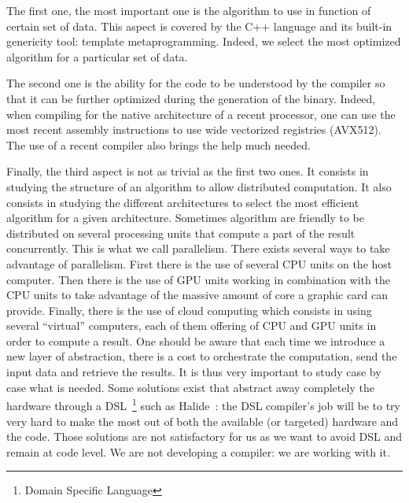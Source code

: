 The first one, the most important one is the algorithm to use in function of certain set of data. This aspect is covered
by the C++ language and its built-in genericity tool: template metaprogramming. Indeed, we select the most optimized
algorithm for a particular set of data.

The second one is the ability for the code to be understood by the compiler so that it can be further optimized during
the generation of the binary. Indeed, when compiling for the native architecture of a recent processor, one can use the
most recent assembly instructions to use wide vectorized registries (AVX512). The use of a recent compiler also brings
the help much needed.

Finally, the third aspect is not as trivial as the first two ones. It consists in studying the structure of an algorithm
to allow distributed computation. It also consists in studying the different architectures to select the most efficient
algorithm for a given architecture. Sometimes algorithm are friendly to be distributed on several processing units that
compute a part of the result concurrently. This is what we call parallelism. There exists several ways to take advantage
of parallelism. First there is the use of several CPU units on the host computer. Then there is the use of GPU units
working in combination with the CPU units to take advantage of the massive amount of core a graphic card can provide.
Finally, there is the use of cloud computing which consists in using several ``virtual'' computers, each of them
offering of CPU and GPU units in order to compute a result. One should be aware that each time we introduce a new layer
of abstraction, there is a cost to orchestrate the computation, send the input data and retrieve the results. It is thus
very important to study case by case what is needed. Some solutions exist that abstract away completely the hardware
through a DSL~\footnote{Domain Specific Language} such as Halide~\parencite{ragankelley.2013.halide}: the DSL compiler's
job will be to try very hard to make the most out of both the available (or targeted) hardware and the code. Those
solutions are not satisfactory for us as we want to avoid DSL and remain at code level. We are not developing a
compiler: we are working with it.

